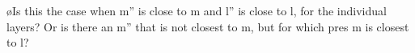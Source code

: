 %
%
%
%


%
%




\toHere

\bl
\o Is this the case when m'' is close to m and l'' is close to l, for the individual layers? Or is there an m'' that is not closest to m, but for which pres m is closest to l?
\el






